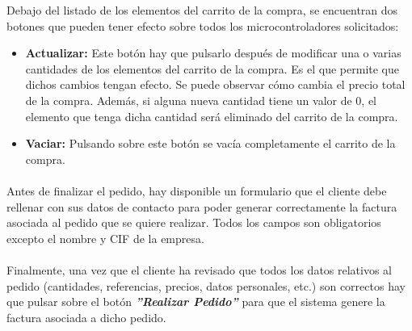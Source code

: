 Debajo del listado de los elementos del carrito de la compra, se encuentran dos botones que pueden tener efecto sobre todos los microcontroladores solicitados:
\begin{itemize}
	\item \textbf{Actualizar:}  Este botón hay que pulsarlo después de modificar una o varias cantidades de los elementos del 
	carrito de la compra. Es el que permite que dichos cambios tengan efecto. Se puede observar cómo cambia el precio total de la compra.
	Además, si alguna nueva cantidad tiene un valor de 0, el elemento que tenga dicha cantidad será eliminado del carrito de la compra.
	
	\item \textbf{Vaciar:}  Pulsando sobre este botón se vacía completamente el carrito de la compra.
\end{itemize}

\paragraph{}Antes de finalizar el pedido, hay disponible un formulario que el cliente debe rellenar con sus datos de contacto para poder generar correctamente la factura asociada al pedido que se quiere realizar. Todos los campos son obligatorios excepto el nombre y CIF de la empresa.

\paragraph{}Finalmente, una vez que el cliente ha revisado que todos los datos relativos al pedido (cantidades, referencias, precios, datos personales, etc.) son correctos hay que pulsar sobre el botón \textbf{\textit{''Realizar Pedido''}} para que el sistema genere la factura asociada a dicho pedido.